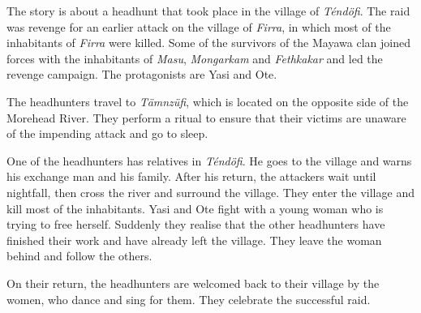 The story is about a headhunt that took place in the village of \textit{Téndöfi}. The raid was revenge for an earlier attack on the village of \textit{Firra}, in which most of the inhabitants of \textit{Firra} were killed. Some of the survivors of the Mayawa clan joined forces with the inhabitants of \textit{Masu}, \textit{Mongarkam} and \textit{Fethkakar} and led the revenge campaign. The protagonists are Yasi and Ote.

The headhunters travel to \textit{Tämnzüfi}, which is located on the opposite side of the Morehead River. They perform a ritual to ensure that their victims are unaware of the impending attack and go to sleep.

One of the headhunters has relatives in \textit{Téndöfi}. He goes to the village and warns his exchange man and his family. After his return, the attackers wait until nightfall, then cross the river and surround the village. They enter the village and kill most of the inhabitants. Yasi and Ote fight with a young woman who is trying to free herself. Suddenly they realise that the other headhunters have finished their work and have already left the village. They leave the woman behind and follow the others.

On their return, the headhunters are welcomed back to their village by the women, who dance and sing for them. They celebrate the successful raid.